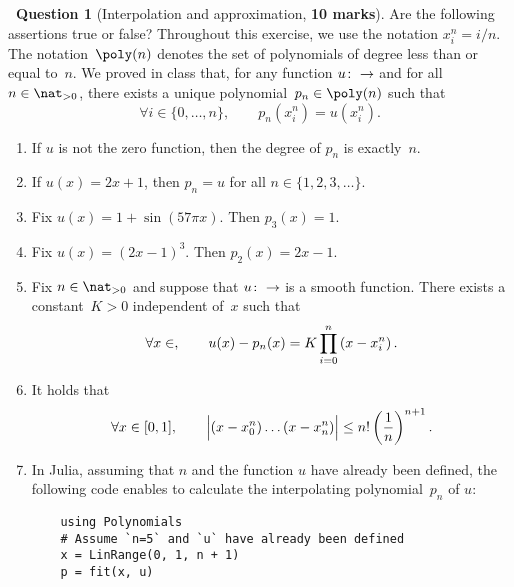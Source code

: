 \documentclass[10pt]{article}
\theoremstyle{definition}
\newtheorem{question}{{\normalfont \faGears}~Question}
\theoremstyle{remark}
\begin{document}
\newpage
\begin{question}
    [Interpolation and approximation, \textbf{10 marks}]
    Are the following assertions true or false?
    Throughout this exercise, we use the notation
    $x^n_i = i/n$.
    The notation~$\poly(n)$ denotes the set of polynomials of degree less than or equal to~$n$.
    We proved in class that,
    for any function $u \colon \real \to \real$ and for all $n \in \nat_{>0}$,
    there exists a unique polynomial~$p_n \in \poly(n)$ such that
    \begin{equation}
        \label{eq:interpolation}
        \forall i \in \{0, \dotsc, n\}, \qquad
        p_n(x^n_i) = u (x^n_i).
    \end{equation}

    \begin{enumerate}
        \item
            If $u$ is not the zero function,
            then the degree of $p_n$ is exactly~$n$.

        \item
            If $u(x) = 2x + 1$,
            then $p_n = u$ for all $n \in \{1, 2, 3, \dotsc\}$.

        \item
            Fix $u(x) = 1 + \sin(57\pi x)$. Then $p_3(x) = 1$.

        \item
            Fix $u(x) = (2x - 1)^3$.
            Then $p_2(x) = 2x - 1$.

        \item
            Fix $n \in \nat_{>0}$ and suppose that $u\colon \real \to \real$ is a smooth function.
            There exists a constant~$K > 0$ independent of~$x$ such that
            \[
                \forall x \in \real,
                \qquad u(x) - p_n(x) = K \prod_{i=0}^{n} \left(x - x^n_i\right).
            \]

        \item
            It holds that
            \[
                \forall x \in [0, 1], \qquad
                \Bigl\lvert (x - x^n_0) \dotsc (x - x^n_n) \Bigr\rvert 
                \leq n! \left(\frac{1}{n}\right)^{n+1}.
            \]

        \item
            In Julia, assuming that $n$ and the function $u$ have already been defined,
            the following code enables to calculate the interpolating polynomial~$p_n$ of $u$:
            \begin{verbatim}
    using Polynomials
    # Assume `n=5` and `u` have already been defined
    x = LinRange(0, 1, n + 1)
    p = fit(x, u)
            \end{verbatim}


\end{enumerate}
\end{question}
\end{document}
